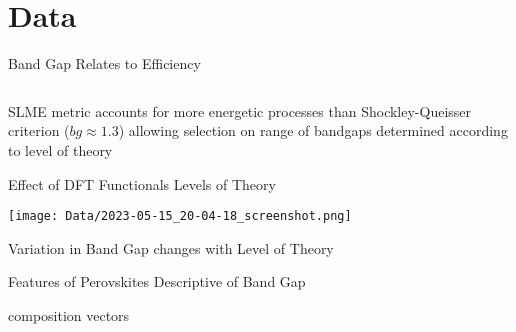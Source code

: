 \documentclass[10pt, aspectratio=169, presentation]{beamer}
\begin{document}
\section{Data}
\label{sec:orgf869c1b}
\begin{frame}[label={sec:org49e7695}]{Band Gap Relates to Efficiency}
\begin{columns}
\begin{column}{0.5\columnwidth}
 
\begin{center}

\end{center}
\end{column}

\begin{column}{0.5\columnwidth}
 
\begin{center}

\end{center}
\end{column}
\end{columns}

SLME metric accounts for more energetic processes than
Shockley-Queisser criterion (\(bg \approx 1.3\)) allowing selection on range
of bandgaps determined according to level of theory\autocite[p.1]{yu-2012-ident-poten}
\end{frame}

\begin{frame}[label={sec:org6dc9425}]{Effect of DFT Functionals Levels of Theory}
\begin{center}
\texttt{[image: Data/2023-05-15\_20-04-18\_screenshot.png]}
\end{center}
\end{frame}

\begin{frame}[label={sec:orgfdb3599}]{Variation in Band Gap changes with Level of Theory}
 
\begin{center}

\end{center}
\end{frame}

\begin{frame}[label={sec:orgabe6329}]{Features of Perovskites Descriptive of Band Gap}
\begin{block}{composition vectors}
\end{block}
\end{frame}
\end{document}

